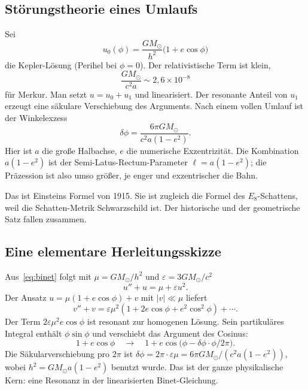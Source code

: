 \documentclass[11pt,a4paper]{article}
\theoremstyle{definition}
\theoremstyle{remark}
\newcommand{\MS}{M_{\odot}}
\newcommand{\dphi}{\delta\phi}
\begin{document}
\subsection{Störungstheorie eines Umlaufs}

Sei
\begin{equation}
u_0(\phi)=\frac{G\MS}{h^2}\bigl(1+e\cos\phi\bigr)
\end{equation}
die Kepler-Lösung (Perihel bei \(\phi=0\)). Der relativistische Term ist klein,
\begin{equation}
\frac{G\MS}{c^2 a}\sim 2{,}6\times 10^{-8}
\end{equation}
für Merkur. Man setzt \(u=u_0+u_1\) und linearisiert. Der resonante Anteil von \(u_1\) erzeugt eine säkulare Verschiebung des Arguments. Nach einem vollen Umlauf ist der Winkelexzess
\begin{equation}
\label{eq:dphi}
\dphi=\frac{6\pi G\MS}{c^2 a(1-e^2)}.
\end{equation}
Hier ist \(a\) die große Halbachse, \(e\) die numerische Exzentrizität. Die Kombination \(a(1-e^2)\) ist der Semi-Latus-Rectum-Parameter \(\ell=a(1-e^2)\); die Präzession ist also umso größer, je enger und exzentrischer die Bahn.

Das ist Einsteins Formel von 1915. Sie ist zugleich die Formel des \(E_8\)-Schattens, weil die Schatten-Metrik Schwarzschild ist. Der historische und der geometrische Satz fallen zusammen.

\subsection{Eine elementare Herleitungsskizze}

Aus~\eqref{eq:binet} folgt mit \(\mu=G\MS/h^2\) und \(\varepsilon=3G\MS/c^2\)
\begin{equation}
u''+u=\mu+\varepsilon u^2.
\end{equation}
Der Ansatz \(u=\mu(1+e\cos\phi)+v\) mit \(|v|\ll\mu\) liefert
\begin{equation}
v''+v=\varepsilon\mu^2(1+2e\cos\phi+e^2\cos^2\phi)+\cdots.
\end{equation}
Der Term \(2\varepsilon\mu^2 e\cos\phi\) ist resonant zur homogenen Lösung. Sein partikuläres Integral enthält \(\phi\sin\phi\) und verschiebt das Argument des Cosinus:
\begin{equation}
1+e\cos\phi\quad\longrightarrow\quad 1+e\cos\bigl(\phi-\dphi\cdot\phi/2\pi\bigr).
\end{equation}
Die Säkularverschiebung pro \(2\pi\) ist \(\dphi=2\pi\cdot\varepsilon\mu=6\pi G\MS/(c^2 a(1-e^2))\), wobei \(h^2=G\MS a(1-e^2)\) benutzt wurde. Das ist der ganze physikalische Kern: eine Resonanz in der linearisierten Binet-Gleichung.
\end{document}
